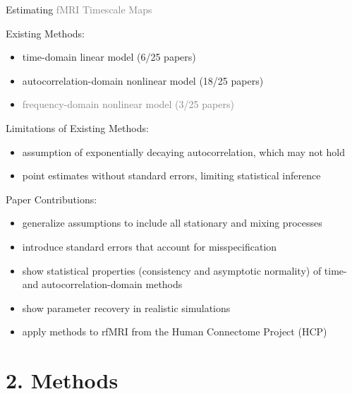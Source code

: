 \documentclass[8pt,aspectratio=169]{beamer}
\begin{document}
\begin{frame}{Estimating \textcolor{gray}{fMRI Timescale Maps}}

Existing Methods:
\begin{itemize}
    \item time-domain linear model (6/25 papers)
    \item autocorrelation-domain nonlinear model (18/25 papers)
    \item \text{[}\textcolor{gray}{frequency-domain nonlinear model (3/25 papers)}\text{]}
\end{itemize}

\vfill
Limitations of Existing Methods:
\begin{itemize}
    \item assumption of exponentially decaying autocorrelation, which may not hold
    \item point estimates without standard errors, limiting statistical inference
\end{itemize}

\vfill
Paper Contributions:
\begin{itemize}
    \item generalize assumptions to include all stationary and mixing processes
    \item introduce standard errors that account for misspecification
    \item show statistical properties (consistency and asymptotic normality) of time- and autocorrelation-domain methods
    \item show parameter recovery in realistic simulations
    \item apply methods to rfMRI from the Human Connectome Project (HCP)
\end{itemize}

\end{frame}


\section{2. Methods}
\end{document}
